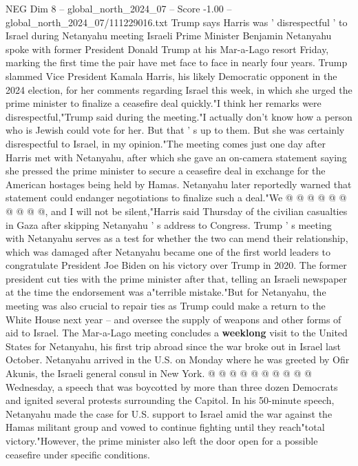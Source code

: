 \begin{textsample}{NEG Dim 8 – global\_north\_2024\_07 – Score -1.00 – global\_north\_2024\_07/111229016.txt}  \label{ex:f8_neg_185}
Trump says Harris was ' disrespectful ' to Israel during Netanyahu meeting Israeli Prime Minister Benjamin Netanyahu spoke with former President Donald Trump at his Mar-a-Lago resort Friday, marking the first time the pair have met face to face in nearly four years.
Trump slammed Vice President Kamala Harris, his likely Democratic opponent in the 2024 election, for her comments regarding Israel this week, in which she urged the prime minister to finalize a ceasefire deal quickly."I think her remarks were disrespectful,"Trump said during the meeting."I actually don't know how a person who is Jewish could vote for her.
But that ' s up to them.
But she was certainly disrespectful to Israel, in my opinion."The meeting comes just one day after Harris met with Netanyahu, after which she gave an on-camera statement saying she pressed the prime minister to secure a ceasefire deal in exchange for the American hostages being held by Hamas.
Netanyahu later reportedly warned that statement could endanger negotiations to finalize such a deal."We @ @ @ @ @ @ @ @ @ @, and I will not be silent,"Harris said Thursday of the civilian casualties in Gaza after skipping Netanyahu ' s address to Congress.
Trump ' s meeting with Netanyahu serves as a test for whether the two can mend their relationship, which was damaged after Netanyahu became one of the first world leaders to congratulate President Joe Biden on his victory over Trump in 2020.
The former president cut ties with the prime minister after that, telling an Israeli newspaper at the time the endorsement was a"terrible mistake."But for Netanyahu, the meeting was also crucial to repair ties as Trump could make a return to the White House next year -- and oversee the supply of weapons and other forms of aid to Israel.
The Mar-a-Lago meeting concludes a \textbf{weeklong} visit to the United States for Netanyahu, his first trip abroad since the war broke out in Israel last October.
Netanyahu arrived in the U.S. on Monday where he was greeted by Ofir Akunis, the Israeli general consul in New York. @ @ @ @ @ @ @ @ @ @ Wednesday, a speech that was boycotted by more than three dozen Democrats and ignited several protests surrounding the Capitol.
In his 50-minute speech, Netanyahu made the case for U.S. support to Israel amid the war against the Hamas militant group and vowed to continue fighting until they reach"total victory."However, the prime minister also left the door open for a possible ceasefire under specific conditions.

\end{textsample}
